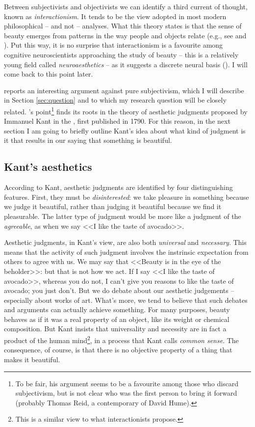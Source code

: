 Between subjectivists and objectivists we can identify a third current of thought, known as \emph{interactionism}. It tends to be the view adopt\-ed in most modern philosophical -- and not -- analyses. What this theory states is that the sense of beauty emerges from patterns in the way people and objects relate (e.g., see \cite{merleau1964primacy} and \cite{ingarden1985selected}). Put this way, it is no surprise that interactionism is a favourite among cognitive neuroscientists approaching the study of beauty -- this is a relatively young field called \emph{neuroaesthetics} -- as it suggests a discrete neural basis (\cite{conway2013neuroaesthetics}). I will come back to this point later.

\cite{graham2005philosophy} reports an interesting argument against pure subjectivism, which I will describe in Section \ref{sec:question} and to which my research question will be closely related. \citeauthor{graham2005philosophy}'s point\footnote{To be fair, his argument seems to be a favourite among those who discard subjectivism, but is not clear who was the first person to bring it forward (probably Thomas Reid, a contemporary of David Hume).} finds its roots in the theory of aesthetic judgments proposed by Immanuel Kant in the , first published in 1790. For this reason, in the next section I am going to briefly outline Kant's idea about what kind of judgment is it that results in our saying that something is beautiful.

\subsection{Kant's aesthetics}\label{subsec:kant}
According to Kant, aesthetic judgments are identified by four distinguishing features. First, they must be \emph{disinterested}: we take pleasure in something because we judge it beautiful, rather than judging it beautiful because we find it pleasurable. The latter type of judgment would be more like a judgment of the \emph{agreeable}, as when we say <<I like the taste of avocado>>.

Aesthetic judgments, in Kant's view, are also both \emph{universal} and \emph{necessary}. This means that the activity of such judgment involves the instrinsic expectation from others to agree with us. We may say that <<Beauty is in the eye of the beholder>>: but that is not how we act. If I say <<I like the taste of avocado>>, whereas you do not, I can't give you reasons to like the taste of avocado; you just don't. But we do debate about our aesthetic judgements -- especially about works of art. What's more, we tend to believe that such debates and arguments can actually achieve something. For many purposes, beauty behaves as if it was a real property of an object, like its weight or chemical composition. But Kant insists that universality and necessity are in fact a product of the human mind\footnote{This is a similar view to what interactionists propose.}, in a process that Kant calls \emph{common sense}. The consequence, of course, is that there is no objective property of a thing that makes it beautiful.

